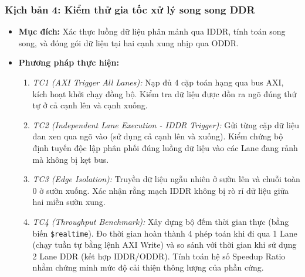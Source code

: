 \subsubsection{Kịch bản 4: Kiểm thử gia tốc xử lý song song DDR}
\begin{itemize}
    \item \textbf{Mục đích:} Xác thực luồng dữ liệu phân mảnh qua IDDR, tính toán song song, và đóng gói dữ liệu tại hai cạnh xung nhịp qua ODDR.
    \item \textbf{Phương pháp thực hiện:}
        \begin{enumerate}
            \item \textit{TC1 (AXI Trigger All Lanes):} Nạp đủ $4$ cặp toán hạng qua bus AXI, kích hoạt khởi chạy đồng bộ. Kiểm tra dữ liệu được dồn ra ngõ  đúng thứ tự ở cả cạnh lên và cạnh xuống.
            \item \textit{TC2 (Independent Lane Execution - IDDR Trigger):} Gửi từng cặp dữ liệu đan xen qua ngõ vào  (sử dụng cả cạnh lên và xuống). Kiểm chứng bộ định tuyến độc lập phân phối đúng luồng dữ liệu vào các Lane đang rảnh mà không bị kẹt bus.
            \item \textit{TC3 (Edge Isolation):} Truyền dữ liệu ngẫu nhiên ở sườn lên và chuỗi toàn $0$ ở sườn xuống. Xác nhận rằng mạch IDDR không bị rò rỉ dữ liệu giữa hai miền sườn xung.
            \item \textit{TC4 (Throughput Benchmark):} Xây dựng bộ đếm thời gian thực (bằng biến \texttt{\$realtime}). Đo thời gian hoàn thành 4 phép toán khi đi qua 1 Lane (chạy tuần tự bằng lệnh AXI Write) và so sánh với thời gian khi sử dụng 2 Lane DDR (kết hợp IDDR/ODDR). Tính toán hệ số Speedup Ratio nhằm chứng minh mức độ cải thiện thông lượng của phần cứng.
        \end{enumerate}
\end{itemize}

